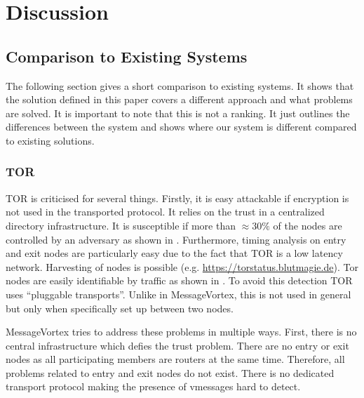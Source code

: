 \documentclass[9pt,journal,compsoc]{IEEEtran}
\begin{document}
\section{Discussion}

\subsection{Comparison to Existing Systems}
The following section gives a short comparison to existing systems. It shows that the solution defined in this paper covers a different approach and what problems are solved. It is important to note that this is not a ranking. It just outlines the differences between the system and shows where our system is different compared to existing solutions.

\subsubsection{TOR}
%
TOR is criticised for several things. Firstly, it is easy attackable if encryption is not used in the transported protocol. It relies on the trust in a centralized directory infrastructure. It is susceptible if more than $\approx 30\%$ of the nodes are controlled by an adversary as shown in \cite{jansen2014sniper}. Furthermore, timing analysis on entry and exit nodes are particularly easy due to the fact that TOR is a low latency network\cite{torta05,esorics10-bandwidth}. Harvesting of nodes is possible (e.g. \url{https://torstatus.blutmagie.de}). Tor nodes are easily identifiable by traffic as shown in \cite{foci12-winter}. To avoid this detection TOR uses ``pluggable transports''. Unlike in MessageVortex, this is not used in general but only when specifically set up between two nodes.

MessageVortex tries to address these problems in multiple ways. First, there is no central infrastructure which defies the trust problem. There are no entry or exit nodes as all participating members are routers at the same time. Therefore, all problems related to entry and exit nodes do not exist. There is no dedicated transport protocol making the presence of vmessages hard to detect.
\end{document}
